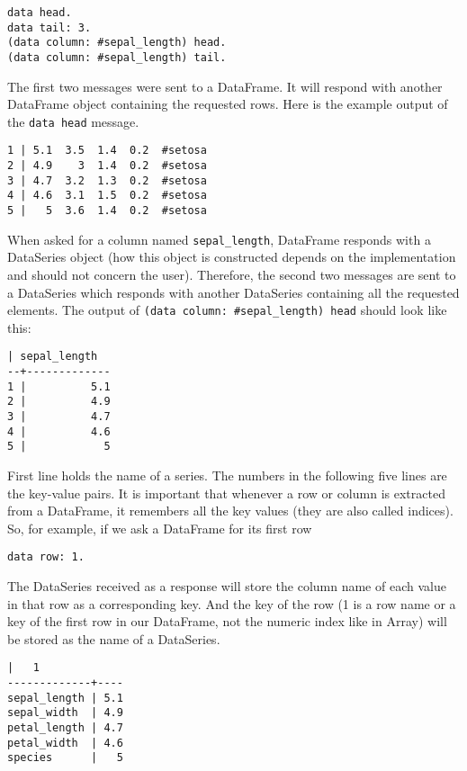 \documentclass[sigplan]{acmart}
\begin{document}
\begin{lstlisting}[basicstyle=\small,language=Smalltalk]
data head.
data tail: 3.
(data column: #sepal_length) head.
(data column: #sepal_length) tail.
\end{lstlisting}

The first two messages were sent to a DataFrame. It will respond with another DataFrame object containing the requested rows. Here is the example output of the \texttt{data head} message.

\begin{lstlisting}[basicstyle=\small, belowskip=1em, aboveskip=1em,]
1 | 5.1  3.5  1.4  0.2  #setosa
2 | 4.9    3  1.4  0.2  #setosa
3 | 4.7  3.2  1.3  0.2  #setosa
4 | 4.6  3.1  1.5  0.2  #setosa
5 |   5  3.6  1.4  0.2  #setosa
\end{lstlisting}

When asked for a column named \texttt{sepal\_length}, DataFrame responds with a DataSeries object (how this object is constructed depends on the implementation and should not concern the user). Therefore, the second two messages are sent to a DataSeries which responds with another DataSeries containing all the requested elements.
The output of \texttt{(data column: \#sepal\_length) head} should look like this:

\begin{lstlisting}[basicstyle=\small]
  | sepal_length
--+-------------
1 |          5.1
2 |          4.9
3 |          4.7
4 |          4.6
5 |            5
\end{lstlisting}

First line holds the name of a series. The numbers in the following five lines are the key-value pairs. It is important that whenever a row or column is extracted from a DataFrame, it remembers all the key values (they are also called indices). So, for example, if we ask a DataFrame for its first row

\begin{lstlisting}[basicstyle=\small,language=Smalltalk]
data row: 1.
\end{lstlisting}

The DataSeries received as a response will store the column name of each value in that row as a corresponding key. And the key of the row (1 is a row name or a key of the first row in our DataFrame, not the numeric index like in Array) will be stored as the name of a DataSeries.

\begin{lstlisting}[basicstyle=\small]
             |   1
-------------+----        
sepal_length | 5.1
sepal_width  | 4.9
petal_length | 4.7 
petal_width  | 4.6
species      |   5 
\end{lstlisting}
\end{document}
